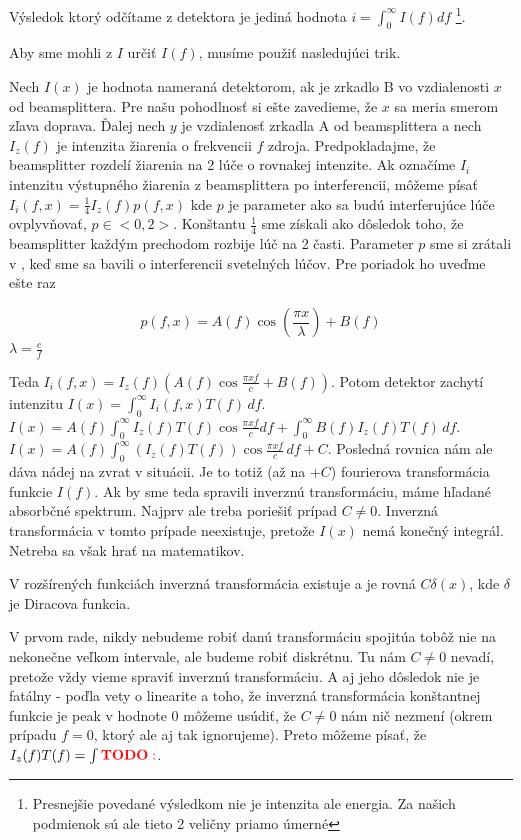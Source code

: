 Výsledok ktorý odčítame z detektora je jediná hodnota $i=\int_0^\infty I(f) df$
\footnote{Presnejšie povedané výsledkom nie je intenzita ale energia.
Za našich podmienok sú ale tieto 2 veličny priamo úmerné}.

Aby sme mohli z $I$ určiť $I(f)$, musíme použiť nasledujúci trik.

Nech $I(x)$ je hodnota nameraná detektorom, ak je zrkadlo B vo
vzdialenosti $x$ od beamsplittera. Pre našu pohodlnosť si ešte zavedieme,
že $x$ sa meria smerom zľava doprava. Ďalej nech $y$ je vzdialenosť zrkadla
A od beamsplittera a nech $I_z(f)$ je intenzita žiarenia o frekvencii
$f$ zdroja. Predpokladajme, že beamsplitter rozdelí žiarenia na 2 lúče
o rovnakej intenzite. Ak označíme $I_i$ intenzitu výstupného
žiarenia z beamsplittera po interferencii, môžeme písať
$I_i(f,x)=\frac{1}{4} I_z(f) p(f,x)$ kde $p$ je parameter ako sa budú
interferujúce lúče ovplyvňovať, $p \in <0,2>$. 
Konštantu $\frac{1}{4}$ sme získali ako dôsledok toho, že beamsplitter
každým prechodom rozbije lúč na 2 časti.
Parameter $p$ sme si zrátali v \todo{}, keď sme sa
bavili o interferencii svetelných lúčov. Pre poriadok ho uveďme ešte
raz 

\begin{equation}
p(f,x)=A(f) \cos(\frac{\pi x}{\lambda}) + B(f)
\end{equation}
$\lambda=\frac{c}{f}$

Teda $I_i(f,x)= I_z(f) (A(f) \cos \frac{\pi x f}{c} + B(f))$. Potom
detektor zachytí intenzitu 
$I(x)=\int_0^\infty I_i(f,x) T(f)\,df$.
$I(x)=A(f) \int_0^\infty I_z(f) T(f) \cos \frac{\pi x f}{c}
df +\int_0^\infty B(f) I_z(f) T(f)\,df$.
$I(x)=A(f) \int_0^\infty (I_z(f) T(f)) \cos \frac{\pi x f}{c}\,df +
C$. Posledná rovnica nám ale dáva nádej na zvrat v situácii.
Je to totiž (až na $+C$) fourierova transformácia
funkcie $I(f)$. Ak by sme teda spravili inverznú transformáciu,
máme hľadané absorbčné spektrum. Najprv ale treba poriešiť
prípad $C\not=0$. 
Inverzná transformácia v tomto prípade
neexistuje, pretože $I(x)$ nemá konečný integrál. Netreba sa však hrať
na matematikov.
\begin{poznamka}
 V rozšírených funkciách inverzná transformácia existuje a je rovná
  $C \delta(x)$, kde $\delta$ je Diracova funkcia.
\end{poznamka}

V prvom rade, nikdy nebudeme robiť danú transformáciu
spojitúa tobôž nie na nekonečne veľkom intervale, ale budeme robiť diskrétnu. 
Tu nám $C\not=0$ nevadí, pretože vždy vieme spraviť inverznú transformáciu. 
A aj jeho dôsledok nie je fatálny - poďla vety o linearite \todo{} a toho, 
že inverzná transformácia konštantnej funkcie 
je peak v hodnote 0\todo{} môžeme 
usúdiť, že $C\not=0$ nám nič nezmení (okrem prípadu $f=0$, ktorý ale
aj tak ignorujeme).
Preto môžeme písať, že
$I_z(f) T(f) = \int {\bf {\color{red} TODO:}}$.




